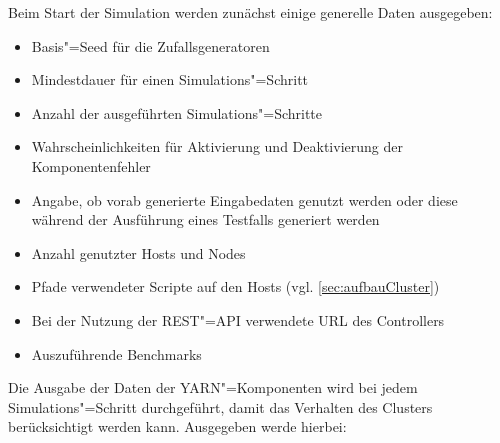 Beim Start der Simulation werden zunächst einige generelle Daten ausgegeben:

\begin{itemize}
    \item Basis"=Seed für die Zufallsgeneratoren
    \item Mindestdauer für einen Simulations"=Schritt
    \item Anzahl der ausgeführten Simulations"=Schritte
    \item Wahrscheinlichkeiten für Aktivierung und Deaktivierung der Komponentenfehler
    \item Angabe, ob vorab generierte Eingabedaten genutzt werden oder diese während der Ausführung eines Testfalls generiert werden
    \item Anzahl genutzter Hosts und Nodes
    \item Pfade verwendeter Scripte auf den Hosts (vgl. \autoref{sec:aufbauCluster})
    \item Bei der Nutzung der REST"=API verwendete URL des Controllers
    \item Auszuführende Benchmarks    
\end{itemize}

Die Ausgabe der Daten der YARN"=Komponenten wird bei jedem Simulations"=Schritt durchgeführt, damit das Verhalten des Clusters berücksichtigt werden kann.
Ausgegeben werde hierbei:


